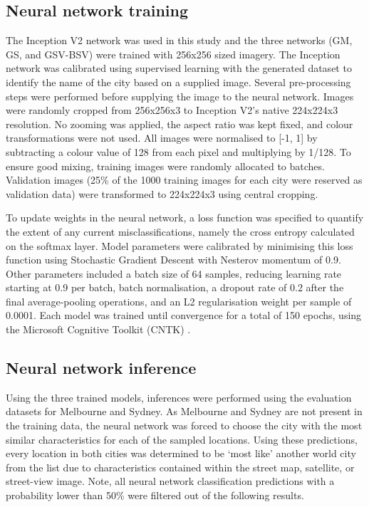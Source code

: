 \documentclass[urbansci,article,submit,moreauthors,pdftex]{Definitions/mdpi}
\begin{document}
\subsection{Neural network training}\label{sec:methods4}    

The Inception V2 network was used in this study and the three networks (GM, GS, and GSV-BSV) were trained with 256x256 sized imagery. The Inception network was calibrated using supervised learning with the generated dataset to identify the name of the city based on a supplied image. Several pre-processing steps were performed before supplying the image to the neural network. Images were randomly cropped from 256x256x3 to Inception V2's native 224x224x3 resolution. No zooming was applied, the aspect ratio was kept fixed, and colour transformations were not used. All images were normalised to [-1, 1] by subtracting a colour value of 128 from each pixel and multiplying by 1/128. To ensure good mixing, training images were randomly allocated to batches. Validation images (25\% of the 1000 training images for each city were reserved as validation data) were transformed to 224x224x3 using central cropping.

To update weights in the neural network, a loss function was specified to quantify the extent of any current misclassifications, namely the cross entropy calculated on the softmax layer. Model parameters were calibrated by minimising this loss function using Stochastic Gradient Descent with Nesterov momentum of 0.9. Other parameters included a batch size of 64 samples, reducing learning rate starting at 0.9 per batch, batch normalisation, a dropout rate of 0.2 after the final average-pooling operations, and an L2 regularisation weight per sample of 0.0001. Each model was trained until convergence for a total of 150 epochs, using the Microsoft Cognitive Toolkit (CNTK) \citep{Yu2015}. 

\subsection{Neural network inference}\label{sec:methods5}    
Using the three trained models, inferences were performed using the evaluation datasets for Melbourne and Sydney. As Melbourne and Sydney are not present in the training data, the neural network was forced to choose the city with the most similar characteristics for each of the sampled locations. Using these predictions, every location in both cities was determined to be `most like' another world city from the list due to  characteristics contained within the street map, satellite, or street-view image. Note, all neural network classification predictions with a probability lower than 50\% were filtered out of the following results.
\end{document}
